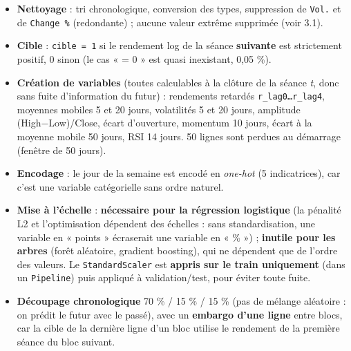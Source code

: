 \documentclass[
  10pt,
]{article}
\providecommand{\tightlist}{%
  \setlength{\itemsep}{0pt}\setlength{\parskip}{0pt}}
\begin{document}
\begin{itemize}
\tightlist
\item
  \textbf{Nettoyage} : tri chronologique, conversion des types,
  suppression de \texttt{Vol.} et de \texttt{Change\ \%} (redondante) ;
  aucune valeur extrême supprimée (voir 3.1).
\item
  \textbf{Cible} : \texttt{cible\ =\ 1} si le rendement log de la séance
  \textbf{suivante} est strictement positif, 0 sinon (le cas « = 0 » est
  quasi inexistant, 0,05 \%).
\item
  \textbf{Création de variables} (toutes calculables à la clôture de la
  séance \emph{t}, donc sans fuite d'information du futur) : rendements
  retardés \texttt{r\_lag0…r\_lag4}, moyennes mobiles 5 et 20 jours,
  volatilités 5 et 20 jours, amplitude (High−Low)/Close, écart
  d'ouverture, momentum 10 jours, écart à la moyenne mobile 50 jours,
  RSI 14 jours. 50 lignes sont perdues au démarrage (fenêtre de 50
  jours).
\item
  \textbf{Encodage} : le jour de la semaine est encodé en \emph{one-hot}
  (5 indicatrices), car c'est une variable catégorielle sans ordre
  naturel.
\item
  \textbf{Mise à l'échelle} : \textbf{nécessaire pour la régression
  logistique} (la pénalité L2 et l'optimisation dépendent des échelles :
  sans standardisation, une variable en « points » écraserait une
  variable en « \% ») ; \textbf{inutile pour les arbres} (forêt
  aléatoire, gradient boosting), qui ne dépendent que de l'ordre des
  valeurs. Le \texttt{StandardScaler} est \textbf{appris sur le train
  uniquement} (dans un \texttt{Pipeline}) puis appliqué à
  validation/test, pour éviter toute fuite.
\item
  \textbf{Découpage chronologique} 70 \% / 15 \% / 15 \% (pas de mélange
  aléatoire : on prédit le futur avec le passé), avec un \textbf{embargo
  d'une ligne} entre blocs, car la cible de la dernière ligne d'un bloc
  utilise le rendement de la première séance du bloc suivant.
\end{itemize}
\end{document}

